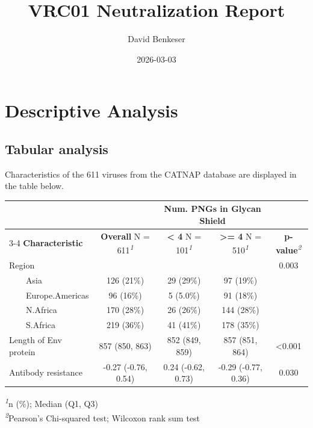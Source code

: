 \documentclass[
]{article}
\title{VRC01 Neutralization Report}
\author{David Benkeser}
\date{2026-03-03}
\begin{document}
\maketitle

\section{Descriptive Analysis}\label{descriptive-analysis}

\subsection{Tabular analysis}\label{tabular-analysis}

Characteristics of the 611 viruses from the CATNAP database are
displayed in the table below.

\begin{table}[t]
\fontsize{12.0pt}{14.0pt}\selectfont
\begin{tabular*}{\linewidth}{@{\extracolsep{\fill}}lcccc}
\toprule
 &  & \multicolumn{2}{c}{{\textbf{Num. PNGs in Glycan Shield}}} &  \\ 
\cmidrule(lr){3-4}
\textbf{Characteristic} & \textbf{Overall}  N = 611\textsuperscript{\textit{1}} & \textbf{\textless{} 4}  N = 101\textsuperscript{\textit{1}} & \textbf{\textgreater{}= 4}  N = 510\textsuperscript{\textit{1}} & \textbf{p-value}\textsuperscript{\textit{2}} \\ 
\midrule\addlinespace[2.5pt]
Region &  &  &  & 0.003 \\ 
    Asia & 126 (21\%) & 29 (29\%) & 97 (19\%) &  \\ 
    Europe.Americas & 96 (16\%) & 5 (5.0\%) & 91 (18\%) &  \\ 
    N.Africa & 170 (28\%) & 26 (26\%) & 144 (28\%) &  \\ 
    S.Africa & 219 (36\%) & 41 (41\%) & 178 (35\%) &  \\ 
Length of Env protein & 857 (850, 863) & 852 (849, 859) & 857 (851, 864) & <0.001 \\ 
Antibody resistance & -0.27 (-0.76, 0.54) & 0.24 (-0.62, 0.73) & -0.29 (-0.77, 0.36) & 0.030 \\ 
\bottomrule
\end{tabular*}
\begin{minipage}{\linewidth}
\vspace{.05em}
\textsuperscript{\textit{1}}n (\%); Median (Q1, Q3)\\
\textsuperscript{\textit{2}}Pearson's Chi-squared test; Wilcoxon rank sum test\\
\end{minipage}
\end{table}
\end{document}
